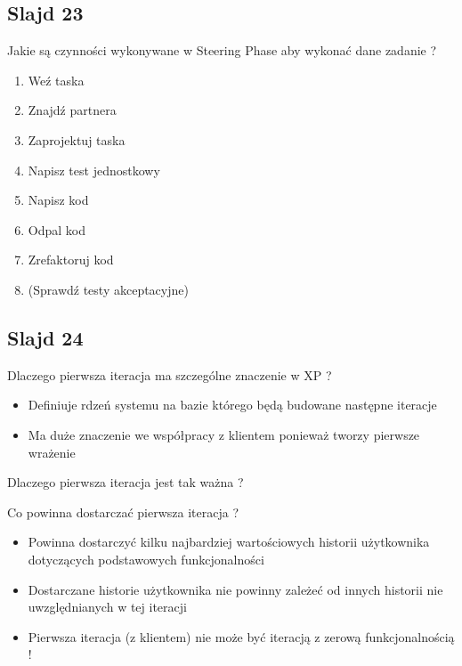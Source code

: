 \documentclass[a4paper,15pt]{article}
\newcommand{\question}[2]{
    \begin{tcolorbox}[colback=mRed!5!white,colframe=mRed,title={Kolokwium 2018 #1}]
        #2
    \end{tcolorbox}
}
\begin{document}
\subsection{Slajd 23}
\begin{framed}
Jakie są czynności wykonywane w Steering Phase aby wykonać dane zadanie ?
\end{framed}
\begin{enumerate}
\item Weź taska
\item Znajdź partnera
\item Zaprojektuj taska
\item Napisz test jednostkowy
\item Napisz kod
\item Odpal kod
\item Zrefaktoruj kod
\item (Sprawdź testy akceptacyjne)
\end{enumerate}


\subsection{Slajd 24}
\begin{framed}
Dlaczego pierwsza iteracja ma szczególne znaczenie w XP ?
\end{framed}
\begin{itemize}
\item Definiuje rdzeń systemu na bazie którego będą budowane następne iteracje
\item Ma duże znaczenie we współpracy z klientem ponieważ tworzy pierwsze wrażenie
\end{itemize}

\question{}{
Dlaczego pierwsza iteracja jest tak ważna ?
}

\begin{framed}
Co powinna dostarczać pierwsza iteracja ?
\end{framed}
\begin{itemize}
\item Powinna dostarczyć kilku najbardziej wartościowych historii użytkownika dotyczących podstawowych funkcjonalności
\item Dostarczane historie użytkownika nie powinny zależeć od innych historii nie uwzględnianych w tej iteracji
\item Pierwsza iteracja (z klientem) nie może być iteracją z zerową funkcjonalnością !
\end{itemize}
\end{document}
